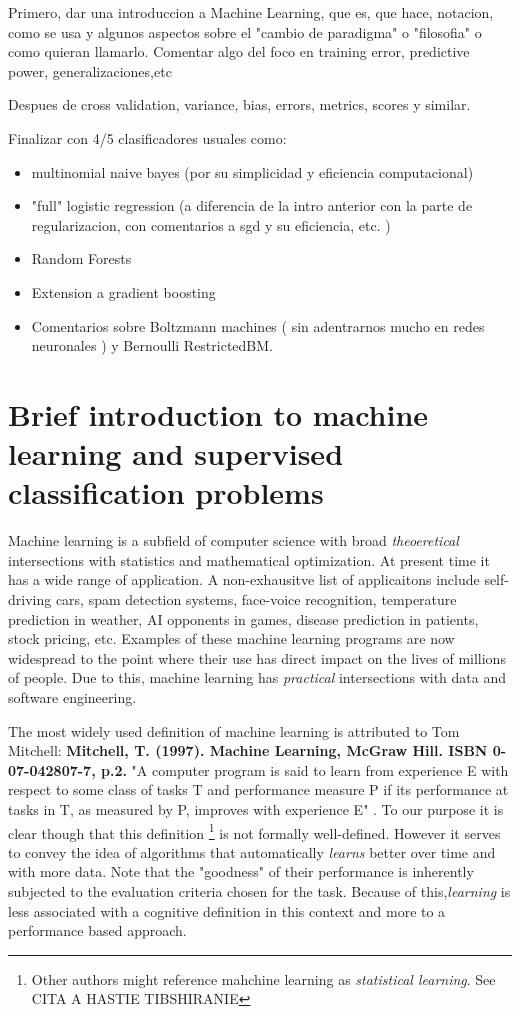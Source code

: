 Primero, dar una introduccion a Machine Learning, que es, que hace, notacion, como se usa y algunos aspectos sobre el "cambio de paradigma" o "filosofia" o como quieran llamarlo. Comentar algo del foco en training error, predictive power, generalizaciones,etc

Despues de cross validation, variance, bias, errors, metrics, scores y similar.

Finalizar con 4/5 clasificadores usuales como: 
\begin{itemize}
	\item multinomial naive bayes (por su simplicidad y eficiencia computacional)
	\item "full" logistic regression (a diferencia de la intro anterior con la parte de regularizacion, con comentarios a sgd y su eficiencia, etc. )
	\item Random Forests
	\item Extension a gradient boosting
	\item Comentarios sobre Boltzmann machines ( sin adentrarnos mucho en redes neuronales ) y Bernoulli RestrictedBM.
\end{itemize}

\section{ Brief introduction to machine learning and supervised classification problems}

Machine learning is a subfield of computer science with broad \textit{theoeretical} intersections with statistics and mathematical optimization. At present time it has a wide range of application. A non-exhausitve list of applicaitons include self-driving cars, spam detection systems, face-voice recognition, temperature prediction in weather, AI opponents in games, disease prediction in patients, stock pricing, etc. Examples of these machine learning programs are now widespread to the point where their use has direct impact on the lives of millions of people. Due to this, machine learning has \textit{practical} intersections with data and software engineering.

The most widely used definition of machine learning is attributed to Tom Mitchell: 	\textbf{Mitchell, T. (1997). Machine Learning, McGraw Hill. ISBN 0-07-042807-7, p.2.} 
"A computer program is said to learn from experience E with respect to some class of tasks T and performance measure P if its performance at tasks in T, as measured by P, improves with experience E" . To our purpose it is clear though that this definition \footnote{Other authors might reference mahchine learning as \textit{statistical learning}. See CITA A HASTIE TIBSHIRANIE} is not formally well-defined. However it serves to convey the idea of algorithms that automatically \textit{learns} better over time and with more data. Note that the "goodness" of their performance is inherently subjected to the evaluation criteria chosen for the task. Because of this,\textit{learning} is less associated with a cognitive definition in this context and more to a performance based approach.


